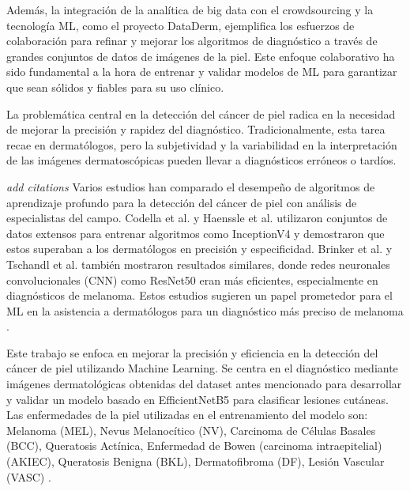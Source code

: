     Además, la integración de la analítica de big data con el crowdsourcing y la tecnología ML, como el proyecto DataDerm, ejemplifica los esfuerzos de colaboración para refinar y mejorar los algoritmos de diagnóstico a través de grandes conjuntos de datos de imágenes de la piel. Este enfoque colaborativo ha sido fundamental a la hora de entrenar y validar modelos de ML para garantizar que sean sólidos y fiables para su uso clínico.



    La problemática central en la detección del cáncer de piel radica en la necesidad de mejorar la precisión y rapidez del diagnóstico. Tradicionalmente, esta tarea recae en dermatólogos, pero la subjetividad y la variabilidad en la interpretación de las imágenes dermatoscópicas pueden llevar a diagnósticos erróneos o tardíos.


    \textit{add citations}
    Varios estudios han comparado el desempeño de algoritmos de aprendizaje profundo para la detección del cáncer de piel con análisis de especialistas del campo. Codella et al. y Haenssle et al. utilizaron conjuntos de datos extensos para entrenar algoritmos como InceptionV4 y demostraron que estos superaban a los dermatólogos en precisión y especificidad. Brinker et al. y Tschandl et al. también mostraron resultados similares, donde redes neuronales convolucionales (CNN) como ResNet50 eran más eficientes, especialmente en diagnósticos de melanoma. Estos estudios sugieren un papel prometedor para el ML en la asistencia a dermatólogos para un diagnóstico más preciso de melanoma .


    Este trabajo se enfoca en mejorar la precisión y eficiencia en la detección del cáncer de piel utilizando Machine Learning. Se centra en el diagnóstico mediante imágenes dermatológicas obtenidas del dataset antes mencionado para desarrollar y validar un modelo basado en EfficientNetB5 para clasificar lesiones cutáneas. Las enfermedades de la piel utilizadas en el entrenamiento del modelo son: Melanoma (MEL), Nevus Melanocítico (NV), Carcinoma de Células Basales (BCC), Queratosis Actínica, Enfermedad de Bowen (carcinoma intraepitelial) (AKIEC), Queratosis Benigna (BKL), Dermatofibroma (DF), Lesión Vascular (VASC) .

